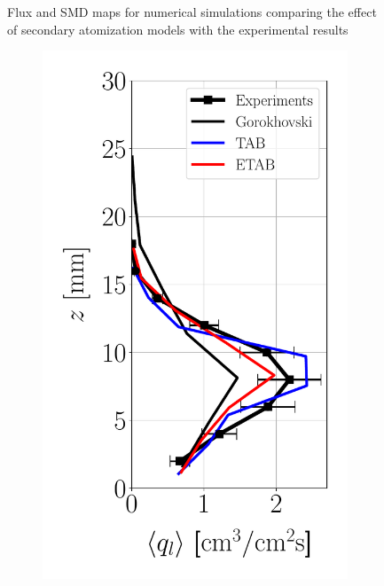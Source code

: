 \begin{figure}[t!]
\caption{Flux and SMD maps for numerical simulations comparing the effect of secondary atomization models with the experimental results}
\label{fig:maps_LGS_JICF_second_atom_models}
\end{figure}

\clearpage

\begin{figure}[h!]
\flushleft
\begin{subfigure}[b]{0.2\textwidth}
	\flushleft
   \includegraphics[scale=0.35]{./part2_developments/figures_ch6_lagrangian_JICF/params_breakup_model/profiles/flux_along_z}

\end{subfigure}
\end{figure}
